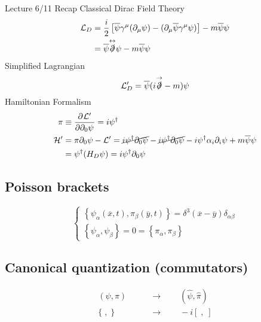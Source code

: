 Lecture 6/11
Recap Classical Dirac Field Theory
\begin{align*}
\mathcal{L}_D &= \frac{i}{2}\left[\overline{\psi}\gamma^\mu(\partial_\mu\psi)-(\partial_\mu\overline{\psi}\gamma^\mu\psi)\right]-m\overline{\psi}\psi \\
&= \overline{\psi}\overset{\leftrightarrow}{\slashed{\partial}}\psi - m\overline{\psi}\psi
\end{align*}
Simplified Lagrangian
\[ \mathcal{L}_D' = \overline{\psi}(i\overset{\rightarrow}{\slashed{\partial}}-m)\psi \]
Hamiltonian Formalism
\begin{align*}
\pi &\equiv  \frac{\partial{^{}}\mathcal{L}'}{\partial{{\partial_0\psi}^{}}}  = i\psi^\dagger \\
\mathcal{H}' &= \pi\partial_0\psi - \mathcal{L}' = \cancel{i\psi^\dagger\partial_0\psi} - \cancel{i\psi^\dagger\partial_0\psi} - i\psi^\dagger\alpha_i\partial_i\psi + m\overline{\psi}\psi \\
&= \psi^\dagger(H_D\psi) = i\psi^\dagger\partial_0\psi
\end{align*}

\subsection{Poisson brackets}
\[ \begin{cases}
\left\{\psi_\alpha(\overline{x},t), \pi_\beta(\overline{y},t)\right\} = \delta^3(\overline{x}- \overline{y})\delta_{\alpha\beta} \\
\left\{\psi_\alpha, \psi_\beta\right\} = 0 = \left\{\pi_\alpha, \pi_\beta\right\}
\end{cases} \]





\subsection{Canonical quantization (commutators)}
\begin{align*}
(\psi,\pi) & \qquad \to \qquad (\hat{\psi},\hat{\pi}) \\
\{\;,\;\} & \qquad \to \qquad -i[\;,\;]
\end{align*}


